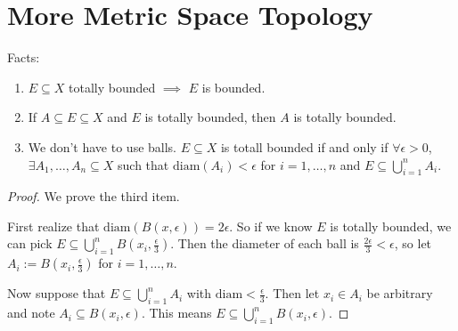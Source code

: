 \documentclass{report}
\begin{document}
\section{More Metric Space Topology}
\noindent Facts:
\begin{enumerate}
    \item $E \subseteq X$ totally bounded $\implies$ $E$ is bounded. 
    \item If $A \subseteq E \subseteq X$ and $E$ is totally bounded, then $A$ is totally bounded.
    \item We don't have to use balls. $E \subseteq X$ is totall bounded if and only if $\forall \epsilon > 0$, $\exists A_1, \ldots, A_n \subseteq X$ such that $\mathrm{diam}(A_i) < \epsilon$ for $i = 1, \ldots, n$ and $E \subseteq \bigcup_{i = 1}^n A_i$.
\end{enumerate}
\begin{proof}
    We prove the third item. 

    First realize that $\mathrm{diam}(B(x, \epsilon)) = 2 \epsilon$. So if we know $E$ is totally bounded, we can pick $E \subseteq \bigcup_{i=1}^n B\left(x_i, \frac \epsilon 3\right)$. Then the diameter of each ball is $\frac{2\epsilon}{3} < \epsilon$, so let $A_i := B\left(x_i, \frac \epsilon 3\right)$ for $i = 1, \ldots, n$.

    Now suppose that $E \subseteq \bigcup_{i=1}^n A_i$ with $\mathrm{diam} < \frac \epsilon 3$. Then let $x_i \in A_i$ be arbitrary and note $A_i \subseteq B(x_i, \epsilon)$. This means $E\subseteq \bigcup_{i=1}^n B(x_i, \epsilon)$.
\end{proof}
\end{document}

